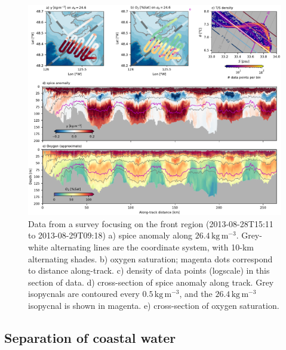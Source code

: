 \documentclass[draft]{agujournal2019}
\begin{document}
\begin{figure}[htbp]
  \begin{center}
    \includegraphics[width=6.2in]{Frontsurvey}
    \caption{Data from a survey focusing on the front region (2013-08-28T15:11 to 2013-08-29T09:18) a) spice anomaly along $26.4\,\mathrm{kg\,m^{-3}}$.  Grey-white alternating lines are the coordinate system, with 10-km alternating shades.   b) oxygen saturation; magenta dots correspond to distance along-track. c) density of data points (logscale) in this section of data.  d) cross-section of spice anomaly along track.  Grey isopycnals are contoured every $0.5\,\mathrm{kg\,m^{-3}}$, and the $26.4\,\mathrm{kg\,m^{-3}}$ isopycnal is shown in magenta.  e) cross-section of oxygen saturation.
      \label{fig:Frontsurvey} }
  \end{center}
\end{figure}



\subsection{Separation of coastal water}
\end{document}
